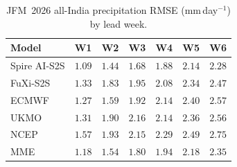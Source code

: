 \begin{table}[t]
  \centering
  \caption{JFM~2026 all-India precipitation RMSE (mm\,day$^{-1}$) by lead week.}
  \label{tab:jfm_rmse_tp}
  \small
  \begin{tabular}{lcccccc}
    \toprule
    Model & W1 & W2 & W3 & W4 & W5 & W6 \\
    \midrule
    Spire AI-S2S   & $\mathbf{1.09}$ & $\mathbf{1.44}$ & $\mathbf{1.68}$ & $\mathbf{1.88}$ & $\mathbf{2.14}$ & $\mathbf{2.28}$ \\
FuXi-S2S       & $1.33$ & $1.83$ & $1.95$ & $2.08$ & $2.34$ & $2.47$ \\
ECMWF          & $1.27$ & $1.59$ & $1.92$ & $2.14$ & $2.40$ & $2.57$ \\
UKMO           & $1.31$ & $1.90$ & $2.16$ & $2.14$ & $2.36$ & $2.56$ \\
NCEP           & $1.57$ & $1.93$ & $2.15$ & $2.29$ & $2.49$ & $2.75$ \\
MME            & $1.18$ & $1.54$ & $1.80$ & $1.94$ & $2.18$ & $2.35$ \\
    \bottomrule
  \end{tabular}
\end{table}
